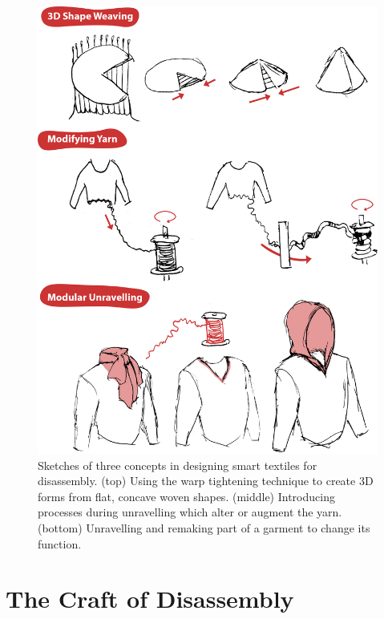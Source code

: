 \begin{figure}
    \centering
    \includegraphics[width=0.9\linewidth]{figs/UF_concepts.png}
    \caption[Three concept sketches in designing smart textiles for disassembly.]{Sketches of three concepts in designing smart textiles for disassembly. (top) Using the warp tightening technique to create 3D forms from flat, concave woven shapes. (middle) Introducing processes during unravelling which alter or augment the yarn. (bottom) Unravelling and remaking part of a garment to change its function.}
    \label{fig:concepts}
\end{figure}

\section{The Craft of Disassembly}

